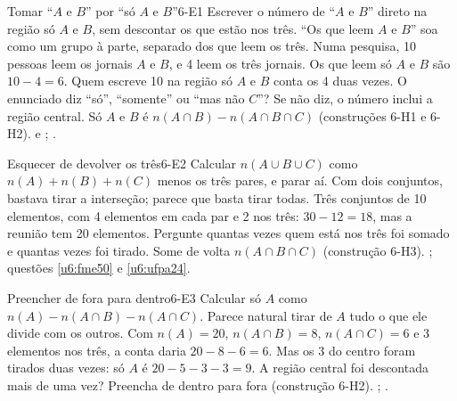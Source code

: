 \ErrosComuns

\begin{erro}{Tomar \enquote{$A$ e $B$} por \enquote{só $A$ e $B$}}{6-E1}
 Escrever o número de \enquote{$A$ e $B$} direto na região só $A$ e $B$, sem descontar os que estão nos três.
 \enquote{Os que leem $A$ e $B$} soa como um grupo à parte, separado dos que leem os três.
 Numa pesquisa, 10 pessoas leem os jornais $A$ e $B$, e 4 leem os três jornais. Os que leem só $A$ e $B$ são $10-4=6$. Quem escreve 10 na região só $A$ e $B$ conta os 4 duas vezes.
 O enunciado diz \enquote{só}, \enquote{somente} ou \enquote{mas não $C$}? Se não diz, o número inclui a região central.
 Só $A$ e $B$ é $n(A\cap B)-n(A\cap B\cap C)$ (construções 6-H1 e 6-H2).
  e ; .
\end{erro}

\begin{erro}{Esquecer de devolver os três}{6-E2}
 Calcular $n(A\cup B\cup C)$ como $n(A)+n(B)+n(C)$ menos os três pares, e parar aí.
 Com dois conjuntos, bastava tirar a interseção; parece que basta tirar todas.
 Três conjuntos de 10 elementos, com 4 elementos em cada par e 2 nos três: $30-12=18$, mas a reunião tem 20 elementos.
 Pergunte quantas vezes quem está nos três foi somado e quantas vezes foi tirado.
 Some de volta $n(A\cap B\cap C)$ (construção 6-H3).
 ; questões \ref{u6:fme50} e \ref{u6:ufpa24}.
\end{erro}

\begin{erro}{Preencher de fora para dentro}{6-E3}
 Calcular só $A$ como $n(A)-n(A\cap B)-n(A\cap C)$.
 Parece natural tirar de $A$ tudo o que ele divide com os outros.
 Com $n(A)=20$, $n(A\cap B)=8$, $n(A\cap C)=6$ e 3 elementos nos três, a conta daria $20-8-6=6$. Mas os 3 do centro foram tirados duas vezes: só $A$ é $20-5-3-3=9$.
 A região central foi descontada mais de uma vez?
 Preencha de dentro para fora (construção 6-H2).
 ; .
\end{erro}

